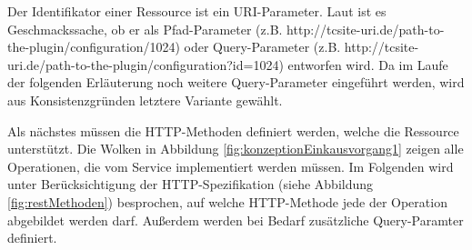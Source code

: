 \documentclass[11pt, a4paper, titlepage, listof=totoc, bibliography=totoc, index=totoc, twoside, openright, headings=normal, draft]{scrreprt}
\begin{document}
Der Identifikator einer Ressource ist ein URI-Parameter. Laut \citet{tilkov11} ist es Geschmackssache, ob er als Pfad-Parameter (z.B. \glqq http://tcsite-uri.de/path-to-the-plugin/configuration/1024\grqq{}) oder Query-Parameter (z.B. \glqq http://tcsite-uri.de/path-to-the-plugin/configuration?id=1024\grqq{}) entworfen wird. Da im Laufe der folgenden Erläuterung noch weitere Query-Parameter eingeführt werden, wird aus Konsistenzgründen letztere Variante gewählt.

Als nächstes müssen die HTTP-Methoden definiert werden, welche die Ressource unterstützt. Die Wolken in Abbildung \ref{fig:konzeptionEinkausvorgang1} zeigen alle Operationen, die vom Service implementiert werden müssen. Im Folgenden wird unter Berücksichtigung der HTTP-Spezifikation (siehe Abbildung \ref{fig:restMethoden}) besprochen, auf welche HTTP-Methode jede der Operation abgebildet werden darf. Außerdem werden bei Bedarf zusätzliche Query-Paramter definiert.
\end{document}
